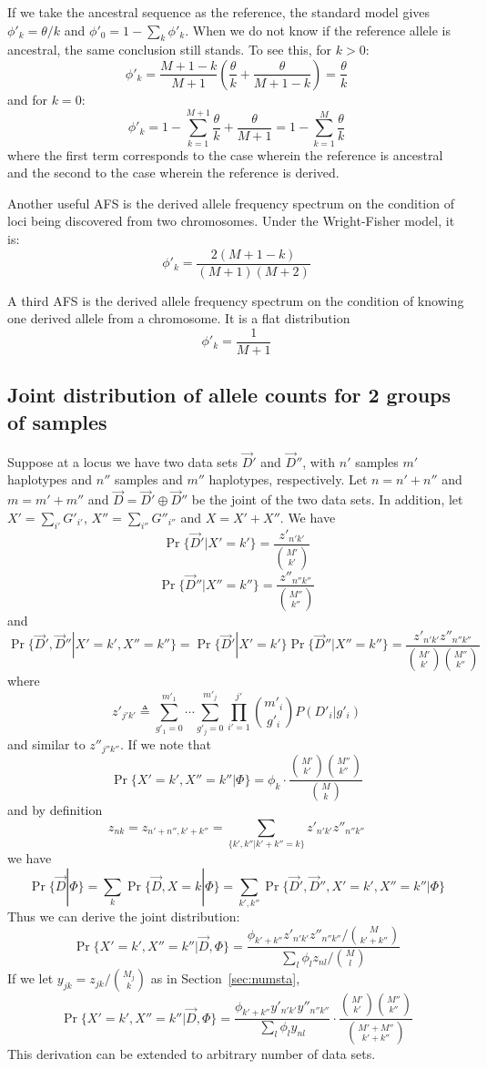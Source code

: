 \documentclass[pdftex,10pt]{book}
\begin{document}
If we take the ancestral sequence as the reference, the standard model
gives $\phi'_k=\theta/k$ and $\phi'_0=1-\sum_k\phi'_k$. When we do not
know if the reference allele is ancestral, the same conclusion still
stands. To see this, for $k>0$:
$$
\phi'_k=\frac{M+1-k}{M+1}\left(\frac{\theta}{k}+\frac{\theta}{M+1-k}\right)=\frac{\theta}{k}
$$
and for $k=0$:
$$
\phi'_k=1-\sum_{k=1}^{M+1}\frac{\theta}{k}+\frac{\theta}{M+1}=1-\sum_{k=1}^{M}\frac{\theta}{k}
$$
where the first term corresponds to the case wherein the reference is
ancestral and the second to the case wherein the reference is derived.

Another useful AFS is the derived allele frequency spectrum on the
condition of loci being discovered from two chromosomes. Under the
Wright-Fisher model, it is:
$$
\phi'_k=\frac{2(M+1-k)}{(M+1)(M+2)}
$$

A third AFS is the derived allele frequency spectrum on the condition of
knowing one derived allele from a chromosome. It is a flat distribution
$$
\phi'_k=\frac{1}{M+1}
$$

\subsection{Joint distribution of allele counts for 2 groups of samples}
Suppose at a locus we have two data sets $\vec{D}'$ and $\vec{D}''$,
with $n'$ samples $m'$ haplotypes and $n''$ samples and $m''$
haplotypes, respectively. Let $n=n'+n''$ and $m=m'+m''$ and
$\vec{D}=\vec{D}'\oplus\vec{D}''$ be the joint of the two data sets. In
addition, let $X'=\sum_{i'}G'_{i'}$, $X''=\sum_{i''}G''_{i''}$ and
$X=X'+X''$. We have
$$
\Pr\{\vec{D}'|X'=k'\}=\frac{z'_{n'k'}}{\binom{M'}{k'}}
$$
$$
\Pr\{\vec{D}''|X''=k''\}=\frac{z''_{n''k''}}{\binom{M''}{k''}}
$$
and
$$
\Pr\{\vec{D}',\vec{D}''|X'=k',X''=k''\}=\Pr\{\vec{D}'|X'=k'\}\Pr\{\vec{D}''|X''=k''\}=\frac{z'_{n'k'}z''_{n''k''}}{\binom{M'}{k'}\binom{M''}{k''}}
$$
where
$$
z'_{j'k'}\triangleq\sum_{g'_1=0}^{m'_1}\cdots\sum_{g'_j=0}^{m'_j}\prod_{i'=1}^{j'}\binom{m'_i}{g'_i}P(D'_i|g'_i)
$$
and similar to $z''_{j''k''}$. If we note that
$$
\Pr\{X'=k',X''=k''|\Phi\}=\phi_k\cdot\frac{\binom{M'}{k'}\binom{M''}{k''}}{\binom{M}{k}}
$$
and by definition
$$
z_{nk}=z_{n'+n'',k'+k''}=\sum_{\{k',k''|k'+k''=k\}}z'_{n'k'}z''_{n''k''}
$$
we have
$$
\Pr\{\vec{D}|\Phi\}=\sum_k\Pr\{\vec{D},X=k|\Phi\}=\sum_{k',k''}\Pr\{\vec{D}',\vec{D}'',X'=k',X''=k''|\Phi\}
$$
Thus we can derive the joint distribution:
\begin{equation}
\Pr\{X'=k',X''=k''|\vec{D},\Phi\}=\frac{\phi_{k'+k''}z'_{n'k'}z''_{n''k''}\big/\binom{M}{k'+k''}}{\sum_l\phi_lz_{nl}\big/\binom{M}{l}}
\end{equation}
If we let $y_{jk}=z_{jk}/\binom{M_j}{k}$ as in Section~\ref{sec:numsta},
$$
\Pr\{X'=k',X''=k''|\vec{D},\Phi\}=\frac{\phi_{k'+k''}y'_{n'k'}y''_{n''k''}}{\sum_l\phi_ly_{nl}}\cdot\frac{\binom{M'}{k'}\binom{M''}{k''}}{\binom{M'+M''}{k'+k''}}
$$
This derivation can be extended to arbitrary number of data sets.
\end{document}
